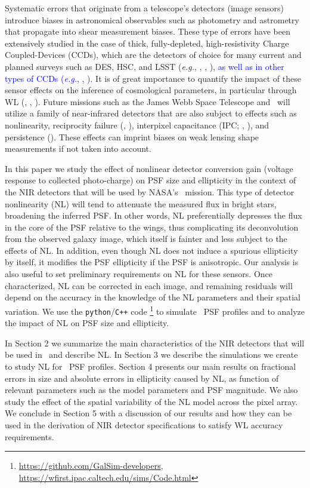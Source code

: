 \documentclass[preprint]{aastex}
\begin{document}
Systematic errors that originate from a telescope's detectors (image sensors) introduce biases in astronomical observables such as photometry and astrometry that propagate into shear measurement biases. These type of errors have been extensively studied in the case of thick, fully-depleted, high-resistivity Charge Coupled-Devices (CCDs), which are the detectors of choice for many current and planned surveys such as DES, HSC, and LSST (\emph{e.g.}, \citealt{stubbs14}, \citealt{plazas14}, \citealt{gruen15}), \textcolor{blue}{as well as in other types of CCDs (\emph{e.g.}, \citealt{prodhomme14}, \citealt{niemi15}).} It is of great importance to quantify the impact of these sensor effects on the inference of cosmological parameters, in particular through WL (\citealt{jarvis14}, \citealt{mandelbaum14b}, \citealt{meyers14}). Future missions such as the James Webb Space Telescope and \wfa\ will utilize a family of near-infrared detectors that are also subject to effects such as nonlinearity, reciprocity failure (\citealt{bohlin05}, \citealt{biesiadzinski11}), interpixel capacitance (IPC; \citealt{mccullough08}, \citealt{kannawadi15}), and persistence (\citealt{smith08}). These effects can imprint biases on weak lensing shape measurements if not taken into account. 

In this paper we study the effect of nonlinear detector conversion gain (voltage response to collected photo-charge) on PSF size and ellipticity in the context of the NIR detectors that will be used by NASA's \wf\ mission. This type of detector nonlinearity (NL) will tend to attenuate the measured flux in bright stars, broadening the inferred PSF. In other words, NL preferentially depresses the flux in the core of the PSF relative to the wings, thus complicating its deconvolution from the observed galaxy image, which itself is fainter and less subject to the effects of NL. In addition, even though NL does not induce a spurious ellipticity by itself, it modifies the PSF ellipticity if the PSF is anisotropic. Our analysis is also useful to set preliminary requirements on NL for these sensors. Once characterized, NL can be corrected in each image, and remaining residuals will depend on the accuracy in the knowledge of the NL parameters and their spatial variation. We use the {\tt{python}}/{\tt{C++}} code \gs\footnote{\url{https://github.com/GalSim-developers}, \url{https://wfirst.ipac.caltech.edu/sims/Code.html}} \citep{rowe15} to simulate \wfa\ PSF profiles and to analyze the impact of NL on PSF size and ellipticity. 

In Section 2 we summarize the main characteristics of the NIR detectors that will be used in \wfa\, and describe NL. In Section 3 we describe the simulations we create to study NL for \wfa\ PSF profiles. Section 4 presents our main results on fractional errors in size and absolute errors in ellipticity caused by NL, as function of relevant parameters such as the model parameters and PSF magnitude. We also study the effect of the spatial variability of the NL model across the pixel array. We conclude in Section 5 with a discussion of our results and how they can be used in the derivation of NIR detector specifications to satisfy WL accuracy requirements.  
\end{document}
